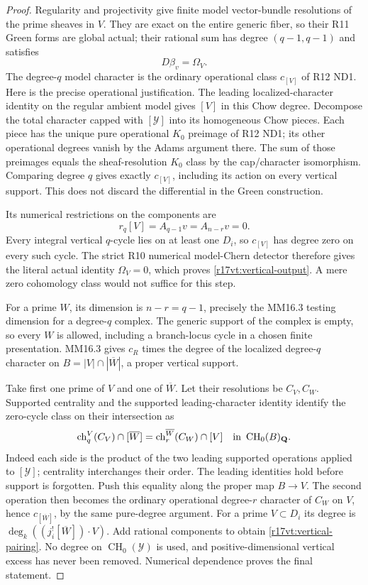 \begin{proof}
Regularity and projectivity give finite model vector-bundle
resolutions of the prime sheaves in $V$. They are exact on
the entire generic fiber, so their R11 Green forms are
global actual; their rational sum has degree $(q-1,q-1)$
and satisfies
\[
                         D\beta_v=\Omega_V.
\]
The degree-$q$ model character is the ordinary operational
class $c_{[V]}$ of R12 ND1. Here is the precise operational
justification. The leading localized-character identity on
the regular ambient model gives $[V]$ in this Chow degree.
Decompose the total character capped with $[\mathcal Y]$
into its homogeneous Chow pieces. Each piece has the unique
pure operational $K_0$ preimage of R12 ND1; its other
operational degrees vanish by the Adams argument there.
The sum of those preimages equals the sheaf-resolution
$K_0$ class by the cap/character isomorphism. Comparing
degree $q$ gives exactly $c_{[V]}$, including its action
on every vertical support. This does not discard the
differential in the Green construction.

Its numerical restrictions on the components are
\[
                    r_q[V]=A_{q-1}v=A_{n-r}v=0.
\]
Every integral vertical $q$-cycle lies on at least one
$D_i$, so $c_{[V]}$ has degree zero on every such cycle.
The strict R10 numerical model-Chern detector therefore
gives the literal actual identity $\Omega_V=0$, which
proves \eqref{r17vt:vertical-output}. A mere zero
cohomology class would not suffice for this step.

For a prime $W$, its dimension is $n-r=q-1$, precisely
the MM16.3 testing dimension for a degree-$q$ complex.
The generic support of the complex is empty, so every
$W$ is allowed, including a branch-locus cycle in a
chosen finite presentation. MM16.3 gives $c_R$ times the degree of the localized
degree-$q$ character on
$B=|V|\cap|\overline W|$, a proper vertical support.

Take first one prime of $V$ and one of $\overline W$.
Let their resolutions be $C_V,C_W$. Supported centrality
and the supported leading-character identity identify the
zero-cycle class on their intersection as
\[
 \operatorname{ch}^{V}_q(C_V)\cap[\overline W]
       =\operatorname{ch}^{\overline W}_r(C_W)\cap[V]
           \quad\hbox{in }\operatorname{CH}_0(B)_{\mathbf Q}.
\]
Indeed each side is the product of the two leading supported
operations applied to $[\mathcal Y]$; centrality interchanges
their order. The leading identities hold before support is
forgotten. Push this equality along the proper map $B\to V$.
The second operation then becomes the ordinary operational
degree-$r$ character of $C_W$ on $V$, hence $c_{[\overline W]}$,
by the same pure-degree argument. For a prime $V\subset D_i$
its degree is
$\deg_k((j_i^![\overline W])\cdot V)$. Add rational
components to obtain \eqref{r17vt:vertical-pairing}.
No degree on $\operatorname{CH}_0(\mathcal Y)$ is used,
and positive-dimensional vertical excess has never been
removed. Numerical dependence proves the final statement.
\end{proof}

